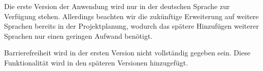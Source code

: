 Die erste Version der Anwendung wird nur in der deutschen Sprache zur Verfügung stehen.
Allerdings beachten wir die zukünftige Erweiterung auf weitere Sprachen bereits in der Projektplanung, wodurch das
spätere Hinzufügen weiterer Sprachen nur einen geringen Aufwand benötigt. \medskip

Barrierefreiheit wird in der ersten Version nicht vollständig gegeben sein.
Diese Funktionalität wird in den späteren Versionen hinzugefügt.